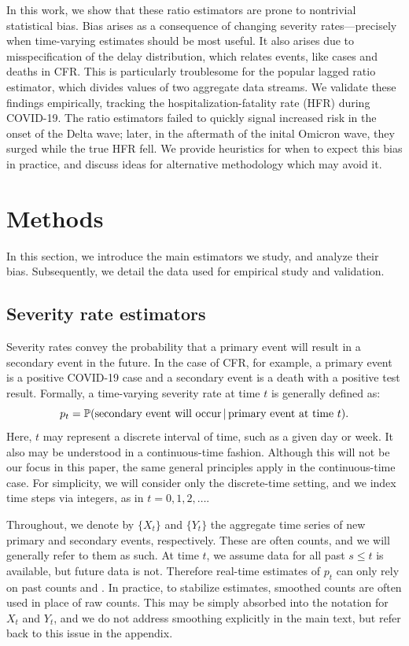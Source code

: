 \documentclass{article}
\newcommand{\given}{\, \vert \,}
\begin{document}
In this work, we show that these ratio estimators are prone to nontrivial
statistical bias. Bias arises as a consequence of changing severity
rates---precisely when time-varying estimates should be most useful. It also 
arises due to misspecification of the delay distribution, which relates events, 
like cases and deaths in CFR. This is particularly troublesome for the popular
lagged ratio estimator, which divides values of two aggregate data streams. We
validate these findings empirically, tracking the hospitalization-fatality rate
(HFR) during COVID-19. The ratio estimators failed to quickly signal increased
risk in the onset of the Delta wave; later, in the aftermath of the inital
Omicron wave, they surged while the true HFR fell. We provide heuristics for
when to expect this bias in practice, and discuss ideas for alternative
methodology which may avoid it. 

\section{Methods}
\label{sec:methods}

In this section, we introduce the main estimators we study, and analyze their 
bias. Subsequently, we detail the data used for empirical study and validation. 

\subsection{Severity rate estimators}
\label{sec:defs}

Severity rates convey the probability that a primary event will result in a
secondary event in the future. In the case of CFR, for example, a primary event
is a positive COVID-19 case and a secondary event is a death with a positive
test result. Formally, a time-varying severity rate at time $t$ is generally
defined as:  
\begin{equation}
\label{eq:severity}
p_t = \P(\text{secondary event will occur} \given \text{primary event at time 
  $t$}).   
\end{equation}
Here, $t$ may represent a discrete interval of time, such as a given day or 
week. It also may be understood in a continuous-time fashion. Although this will    
not be our focus in this paper, the same general principles apply in the
continuous-time case. For simplicity, we will consider only the discrete-time 
setting, and we index time steps via integers, as in $t=0,1,2,\dots$.    

Throughout, we denote by $\{X_t\}$ and $\{Y_t\}$ the aggregate time series of 
new primary and secondary events, respectively. These are often counts, and we
will generally refer to them as such. At time $t$, we assume data for all past
$s \leq t$ is available, but future data is not. Therefore real-time estimates of
$p_t$ can only rely on past counts  and
. In practice, to stabilize estimates, smoothed
counts are often used in place of raw counts. This may be simply absorbed into 
the notation for $X_t$ and $Y_t$, and we do not address smoothing explicitly in
the main text, but refer back to this issue in the appendix.
\end{document}
